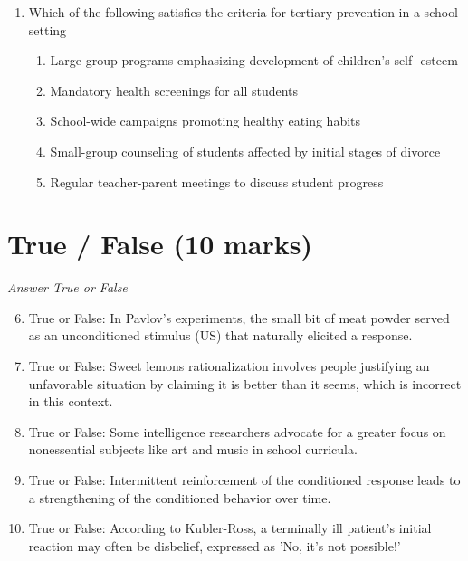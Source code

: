 \documentclass[12pt]{article}
\begin{document}
\begin{enumerate}[label=\arabic*.]
\begin{enumerate}[label=(\alph*)]
    \item rationality versus irrationality
    \item stability versus change
    \item cognition versus behavior
    \item qualitative versus quantitative data
    \item conscious versus unconscious influences
\end{enumerate}
\item Which of the following satisfies the criteria for tertiary prevention in a school setting
\begin{enumerate}[label=(\alph*)]
    \item Large-group programs emphasizing development of children's self- esteem
    \item Mandatory health screenings for all students
    \item School-wide campaigns promoting healthy eating habits
    \item Small-group counseling of students affected by initial stages of divorce
    \item Regular teacher-parent meetings to discuss student progress
\end{enumerate}
\end{enumerate}

\section*{True / False (10 marks)}
\textit{Answer True or False}
\begin{enumerate}[label=\arabic*.]
\setcounter{enumi}{5}
\item True or False: In Pavlov's experiments, the small bit of meat powder served as an unconditioned stimulus (US) that naturally elicited a response.
\item True or False: Sweet lemons rationalization involves people justifying an unfavorable situation by claiming it is better than it seems, which is incorrect in this context.
\item True or False: Some intelligence researchers advocate for a greater focus on nonessential subjects like art and music in school curricula.
\item True or False: Intermittent reinforcement of the conditioned response leads to a strengthening of the conditioned behavior over time.
\item True or False: According to Kubler-Ross, a terminally ill patient's initial reaction may often be disbelief, expressed as 'No, it's not possible!'
\end{enumerate}
\end{document}
